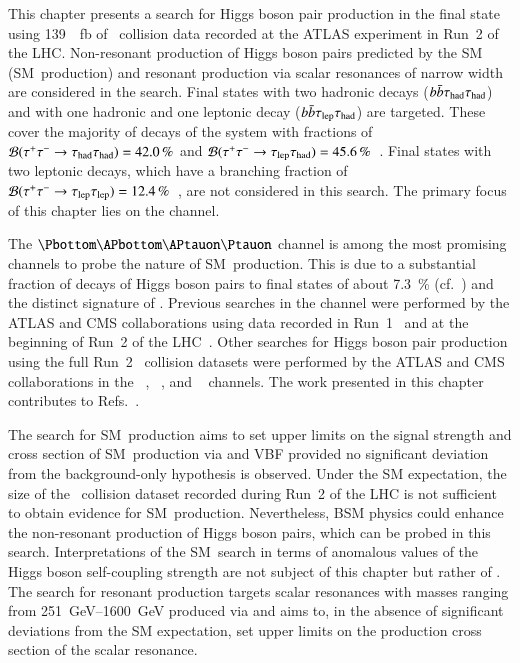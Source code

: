 This chapter presents a search for Higgs boson pair production in the \bbtautau
final state using \SI{139}{\per\femto\barn} of \pp~collision data recorded at
the ATLAS experiment in Run~2 of the LHC. Non-resonant production of Higgs boson
pairs predicted by the SM (SM~\HH production) and resonant production via scalar
resonances of narrow width are considered in the search. Final states with two
hadronic \tauleptonC decays ($b\bar{b}\tau_{\text{had}}\tau_{\text{had}}$) and with one hadronic and one
leptonic \tauleptonC decay ($b\bar{b}\tau_{\text{lep}}\tau_{\text{had}}$) are targeted. These cover the
majority of decays of the \tautau system with fractions of
$\mathcal{B}(\tau^{+} \tau^{-} \to \tau_{\text{had}}\tau_{\text{had}}) = \SI{42.0}{\percent}$ and
$\mathcal{B}(\tau^{+} \tau^{-} \to \tau_{\text{lep}}\tau_{\text{had}}) =
\SI{45.6}{\percent}$~\cite{Zyla:2020zbs}. Final states with two leptonic
\tauleptonC decays, which have a branching fraction of
$\mathcal{B}(\tau^{+} \tau^{-} \to \tau_{\text{lep}}\tau_{\text{lep}}) =
\SI{12.4}{\percent}$~\cite{Zyla:2020zbs}, are not considered in this search.
The primary focus of this chapter lies on the \hadhad channel.

The $\bbtautau$ channel is among the most promising channels to probe the nature
of SM~\HH production. This is due to a substantial fraction of decays of Higgs
boson pairs to \bbtautau final states of about \SI{7.3}{\percent}
(cf.~) and the distinct signature of
\tauleptons. Previous searches in the \bbtautau channel were performed by the
ATLAS and CMS collaborations using data recorded in
Run~1~\cite{HIGG-2013-33,CMS-HIG-15-013} and at the beginning of Run~2 of the
LHC~\cite{HIGG-2016-16-witherratum,CMS-HIG-17-002}.  Other searches for Higgs
boson pair production using the full Run~2 \pp~collision datasets were performed
by the ATLAS and CMS collaborations in the \bbtautau~\cite{CMS-HIG-20-010},
\bbbb~\cite{HDBS-2019-29,CMS-HIG-20-005}, and
\bbyy~\cite{HDBS-2018-34,CMS-HIG-19-018} channels.
The work presented in this chapter contributes to
Refs.~\cite{ATLAS-CONF-2021-030,HDBS-2018-40}.

The search for SM~\HH production aims to set upper limits on the signal strength
and cross section of SM~\HH production via \ggF and VBF provided no significant
deviation from the background-only hypothesis is observed. Under the SM
expectation, the size of the \pp~collision dataset recorded during Run~2 of the
LHC is not sufficient to obtain evidence for SM~\HH production.  Nevertheless,
BSM physics could enhance the non-resonant production of Higgs boson pairs,
which can be probed in this search.
Interpretations of the SM~\HH search in terms of anomalous values of the Higgs
boson self-coupling strength are not subject of this chapter but rather of
. The search for resonant \HH production targets
scalar resonances with masses ranging from \SIrange{251}{1600}{\GeV} produced
via \ggF and aims to, in the absence of significant deviations from the SM
expectation, set upper limits on the production cross section of the scalar
resonance.

